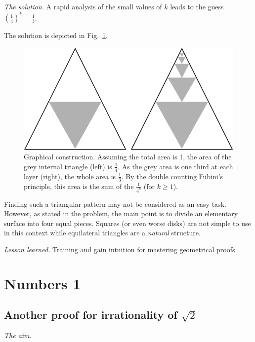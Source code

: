 \noindent \textit{The solution.}
A rapid analysis of the small values of $k$ leads to the guess $(\frac{1}{4})^k = \frac{1}{3}$.
 
The solution is depicted in Fig.~\ref{Fig:Sumgeo1sur4}. 
\begin{figure}
\begin{center}
        \includegraphics[scale=0.3]{FiguresArithmetic/SumGeometric1sur4}
        \caption{Graphical construction. Assuming the total area is 1, the area of the grey internal triangle (left) is $\frac{1}{4}$.
        As the grey area is one third at each layer (right), the whole area is $\frac{1}{3}$.
        By the double counting Fubini's principle, this area is the sum of the $\frac{1}{4^k}$ (for $k \geq 1$).}
        \label{Fig:Sumgeo1sur4}
\end{center}
\end{figure}

Finding such a triangular pattern may not be considered as an easy task.
However, as stated in the problem, the main point is to divide an elementary surface
into four equal pieces. 
Squares (or even worse disks) are not simple to use in this context while equilateral triangles 
are a \textit{natural} structure. 
\medskip

\noindent \textit{Lesson learned.}
Training and gain intuition for mastering geometrical proofs. 


\section{Numbers 1}

\subsection{Another proof for irrationality of $\sqrt{2}$}

\noindent \textit{The aim.}

